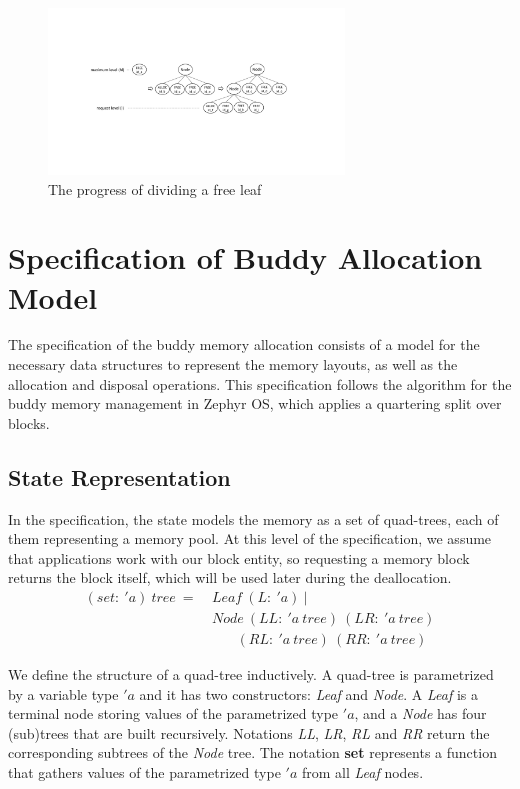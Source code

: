 \begin{figure}[htbp]
	\centering
	\includegraphics[width=0.7\textwidth]{fig1.pdf}
	\caption{The progress of dividing a free leaf}
	\label{fig:splitleaf}
\end{figure}

\section{Specification of Buddy Allocation Model}\label{sec:spec}
The specification of the buddy memory allocation consists of a model for the necessary data structures to represent the memory layouts, as well as the allocation and disposal operations. This specification follows the algorithm for the buddy memory management in Zephyr OS, which applies a quartering split over blocks.

\subsection{State Representation}\label{statedes}
In the specification, the state models the memory as a set of quad-trees, each of them representing a memory pool. At this level of the specification, we assume that applications work with our block entity, so requesting a memory block returns the block itself, which will be used later during the deallocation.
\begin{align*}
(set:\ 'a)\ tree\ =\ &Leaf\ (L:\ 'a)\ | \\
&Node\ (LL:\ 'a\ tree)\ (LR:\ 'a\ tree)\\
&\ \ \ \ \ \ \ \ (RL:\ 'a\ tree)\ (RR:\ 'a\ tree)
\end{align*}

We define the structure of a quad-tree inductively. A quad-tree is parametrized by a variable type $'a$ and it has two constructors: \emph{Leaf} and \emph{Node}. A \emph{Leaf} is a terminal node storing values of the parametrized type $'a$, and a \emph{Node} has four (sub)trees that are built recursively. Notations \emph{LL}, \emph{LR}, \emph{RL} and \emph{RR} return the corresponding subtrees of the \emph{Node} tree. The notation \textbf{set} represents a function that gathers values of the parametrized type $'a$ from all \emph{Leaf} nodes.

